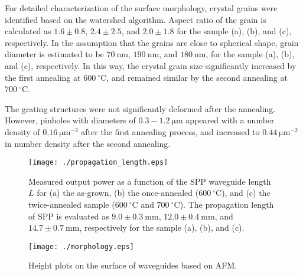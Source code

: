 \documentclass[twocolumn,10.5pt,a4]{article}
\begin{document}
For detailed characterization of the surface morphology, crystal grains were identified based on the watershed algorithm. Aspect ratio of the grain is calculated as $1.6\pm0.8$, $2.4\pm2.5$, and $2.0\pm1.8$ for the sample (a), (b), and (c), respectively. In the assumption that the grains are close to spherical shape, grain diameter is estimated to be $70\:\mathrm{nm}$, $190\:\mathrm{nm}$, and $180\:\mathrm{nm}$, for the sample (a), (b), and (c), respectively.
In this way, the crystal grain size significantly increased by the first annealing at $600\:^\circ\mathrm{C}$, and remained similar by the second annealing at $700\:^\circ\mathrm{C}$.

The grating structures were not significantly deformed after the annealing. However, pinholes with diameters of $0.3-1.2\:\mathrm{\mu m}$ appeared with a number density of $0.16\:\mathrm{\mu m^{-2}}$ after the first annealing process, and increased to $0.44\:\mathrm{\mu m^{-2}}$ in number density after the second annealing.

 \begin{figure}[!htbp]
   \begin{center}
    \texttt{[image: ./propagation\_length.eps]}
    \caption{Measured output power as a function of the SPP waveguide length $L$ for (a) the as-grown, (b) the once-annealed ($600\:^\circ\mathrm{C}$), and (c) the twice-annealed sample ($600\:^\circ\mathrm{C}$ and $700\:^\circ\mathrm{C}$). The propagation length of SPP is evaluated as $9.0\pm0.3\:\mathrm{mm}$, $12.0\pm0.4\:\mathrm{mm}$, and $14.7\pm0.7\:\mathrm{mm}$, respectively for the sample (a), (b), and (c).}
       \label{fig:propagation_length}
   \end{center}
\end{figure}

 \begin{figure}[!htbp]
   \begin{center}
    \texttt{[image: ./morphology.eps]}
    \caption{Height plots on the surface of waveguides based on AFM.}
    \label{fig:morphology}
   \end{center}
\end{figure}
\end{document}
